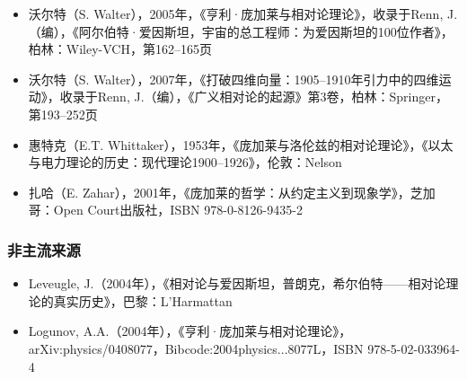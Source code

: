 \begin{itemize}
\item 沃尔特（S. Walter），2005年，《亨利·庞加莱与相对论理论》，收录于Renn, J.（编），《阿尔伯特·爱因斯坦，宇宙的总工程师：为爱因斯坦的100位作者》，柏林：Wiley-VCH，第162–165页  
\item 沃尔特（S. Walter），2007年，《打破四维向量：1905–1910年引力中的四维运动》，收录于Renn, J.（编），《广义相对论的起源》第3卷，柏林：Springer，第193–252页  
\item 惠特克（E.T. Whittaker），1953年，《庞加莱与洛伦兹的相对论理论》，《以太与电力理论的历史：现代理论1900–1926》，伦敦：Nelson  
\item 扎哈（E. Zahar），2001年，《庞加莱的哲学：从约定主义到现象学》，芝加哥：Open Court出版社，ISBN 978-0-8126-9435-2
\end{itemize}
\subsubsection{非主流来源}  
\begin{itemize}
\item Leveugle, J.（2004年），《相对论与爱因斯坦，普朗克，希尔伯特——相对论理论的真实历史》，巴黎：L'Harmattan  
\item Logunov, A.A.（2004年），《亨利·庞加莱与相对论理论》，arXiv:physics/0408077，Bibcode:2004physics...8077L，ISBN 978-5-02-033964-4
\end{itemize}
